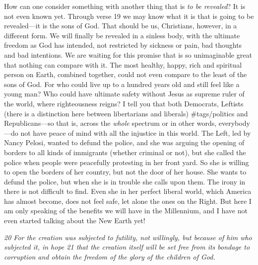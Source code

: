 How can one consider something with another thing that is \emph{to be
revealed}? It is not even known yet. Through verse 19 we may know what
it is that is going to be revealed---it is the sons of God. That should
be us, Christians, however, in a different form. We will finally be
revealed in a sinless body, with the ultimate freedom as God has
intended, not restricted by sickness or pain, bad thoughts and bad
intentions. We are waiting for this promise that is so unimaginable
great that nothing can compare with it. The most healthy, happy, rich
and spiritual person on Earth, combined together, could not even compare
to the least of the sons of God. For who could live up to a hundred
years old and still feel like a young man? Who could have ultimate
safety without Jesus as supreme ruler of the world, where righteousness
reigns? I tell you that both Democrats, Leftists (there is a distinction
here between libertarians and liberals) \#tags/politics and
Republicans---so that is, across the \emph{whole} spectrum or in other
words, everybody---do not have peace of mind with all the injustice in
this world. The Left, led by Nancy Pelosi, wanted to defund the police,
and she was arguing the opening of borders to all kinds of immigrants
(whether criminal or not), but she called the police when people were
peacefully protesting in her front yard. So she is willing to open the
borders of her country, but not the door of her house. She wants to
defund the police, but when she is in trouble she calls upon them. The
irony in there is not difficult to find. Even she in her perfect liberal
world, which America has almost become, does not feel safe, let alone
the ones on the Right. But here I am only speaking of the benefits we
will have in the Millennium, and I have not even started talking about
the New Earth yet!

\emph{20 For the creation was subjected to futility, not willingly, but
because of him who subjected it, in hope 21 that the creation itself
will be set free from its bondage to corruption and obtain the freedom
of the glory of the children of God.}

